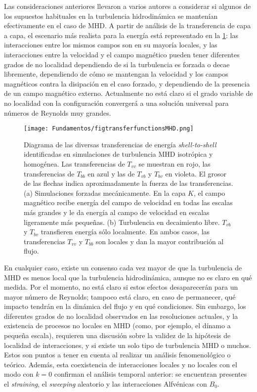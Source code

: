 Las consideraciones anteriores llevaron a varios autores a considerar
si algunos de los supuestos habituales en la turbulencia hidrodinámica
se mantenían efectivamente en el caso de MHD. A partir de análisis de
la transferencia de capa a capa, el escenario más realista para la
energía está representado en la \cref{fig:transferfunctionsMHD}: las
interacciones entre los mismos campos son en su mayoría locales, y las
interacciones entre la velocidad y el campo magnético pueden tener
diferentes grados de no localidad dependiendo de si la turbulencia es
forzada o decae libremente, dependiendo de cómo se mantengan la
velocidad y los campos magnéticos contra la disipación en el caso
forzado, y dependiendo de la presencia de un campo magnético
externo. Actualmente no está claro si el grado variable de no
localidad con la configuración convergerá a una solución universal
para números de Reynolds muy grandes.
\begin{figure}[h!]
  \centering
  \texttt{[image: Fundamentos/figtransferfunctionsMHD.png]}
  \caption{Diagrama de las diversas transferencias de energía
    \emph{shell-to-shell} identificadas en simulaciones de turbulencia
    MHD isotrópica y homogénea. Las transferencias de $T_{vv}$ se
    muestran en rojo, las transferencias de $T_{bb}$ en azul y las de
    $T_{vb}$ y $T_{bv}$ en violeta. El grosor de las flechas indica
    aproximadamente la fuerza de las transferencias. (a) Simulaciones
    forzadas mecánicamente. En la capa $K$, el campo magnético recibe
    energía del campo de velocidad en todas las escalas más grandes y
    le da energía al campo de velocidad en escalas ligeramente más
    pequeñas. (b) Turbulencia en decaimiento libre. $T_{vb}$ y
    $T_{bv}$ transfieren energía sólo localmente. En ambos casos, las
    transferencias $T_{vv}$ y $T_{bb}$ son locales y dan la mayor
    contribución al flujo.}
  \label{fig:transferfunctionsMHD}
\end{figure}

En cualquier caso, existe un consenso cada vez mayor de que la
turbulencia de MHD es menos local que la turbulencia hidrodinámica,
aunque no es claro en qué medida. Por el momento, no está claro si
estos efectos desaparecerán para un mayor número de Reynolds; tampoco
está claro, en caso de permanecer, qué impacto tendrán en la dinámica
del flujo y en qué condiciones. Sin embargo, los diferentes grados de
no localidad observados en las resoluciones actuales, y la existencia
de procesos no locales en MHD (como, por ejemplo, el dínamo a pequeña
escala), requieren una discusión sobre la validez de la hipótesis de
localidad de interacciones, y si existe un solo tipo de turbulencia
MHD o muchos. Estos son puntos a tener en cuenta al realizar un
análisis fenomenológico o teórico. Además, esta coexistencia de
interacciones locales y no locales con el modo con $k=0$ confirman el
análisis temporal anterior: se encuentran presentes
el \textit{straining}, el \textit{sweeping} aleatorio y las
interacciones Alfv\'enicas con $B_0$.

